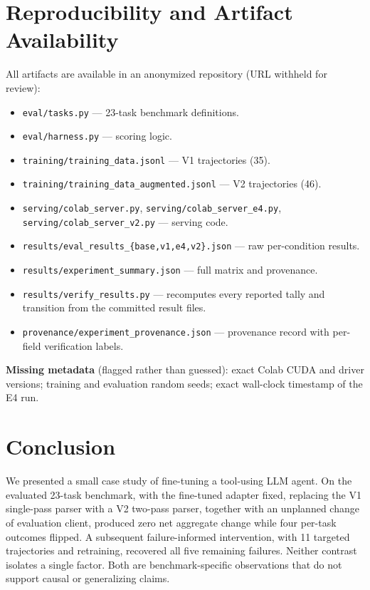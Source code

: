 \documentclass[10pt,twocolumn]{article}
\newcommand{\code}[1]{\texttt{#1}}
\begin{document}
\section{Reproducibility and Artifact Availability}

All artifacts are available in an anonymized repository (URL withheld for review):
\begin{itemize}\itemsep2pt
\item \code{eval/tasks.py} --- 23-task benchmark definitions.
\item \code{eval/harness.py} --- scoring logic.
\item \code{training/training\_data.jsonl} --- V1 trajectories (35).
\item \code{training/training\_data\_augmented.jsonl} --- V2 trajectories (46).
\item \code{serving/colab\_server.py}, \code{serving/colab\_server\_e4.py}, \code{serving/colab\_server\_v2.py} --- serving code.
\item \code{results/eval\_results\_\{base,v1,e4,v2\}.json} --- raw per-condition results.
\item \code{results/experiment\_summary.json} --- full matrix and provenance.
\item \code{results/verify\_results.py} --- recomputes every reported tally and transition from the committed result files.
\item \code{provenance/experiment\_provenance.json} --- provenance record with per-field verification labels.
\end{itemize}

\textbf{Missing metadata} (flagged rather than guessed): exact Colab CUDA and driver versions; training and evaluation random seeds; exact wall-clock timestamp of the E4 run.

\section{Conclusion}

We presented a small case study of fine-tuning a tool-using LLM agent. On the evaluated 23-task benchmark, with the fine-tuned adapter fixed, replacing the V1 single-pass parser with a V2 two-pass parser, together with an unplanned change of evaluation client, produced zero net aggregate change while four per-task outcomes flipped. A subsequent failure-informed intervention, with 11 targeted trajectories and retraining, recovered all five remaining failures. Neither contrast isolates a single factor. Both are benchmark-specific observations that do not support causal or generalizing claims.
\end{document}
